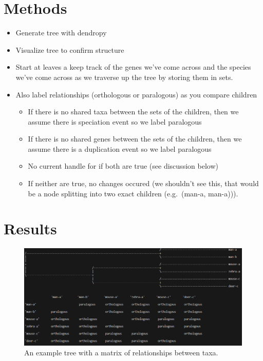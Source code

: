 \documentclass[
  11pt,
  letterpaper,
  oneside]{book}
\providecommand{\tightlist}{%
  \setlength{\itemsep}{0pt}\setlength{\parskip}{0pt}}\usepackage{longtable,booktabs,array}
\begin{document}
\hypertarget{methods}{%
\section{Methods}\label{methods}}

\begin{itemize}
\tightlist
\item
  Generate tree with dendropy
\item
  Visualize tree to confirm structure
\item
  Start at leaves a keep track of the genes we've come across and the
  species we've come across as we traverse up the tree by storing them
  in sets.
\item
  Also label relationships (orthologous or paralogous) as you compare
  children

  \begin{itemize}
  \tightlist
  \item
    If there is no shared taxa between the sets of the children, then we
    assume there is speciation event so we label paralogous
  \item
    If there is no shared genes between the sets of the children, then
    we assume there is a duplication event so we label paralogous
  \item
    No current handle for if both are true (see discussion below)
  \item
    If neither are true, no changes occured (we shouldn't see this, that
    would be a node splitting into two exact children (e.g.~(man-a,
    man-a))).
  \end{itemize}
\end{itemize}

\hypertarget{results}{%
\section{Results}\label{results}}

\begin{figure}

{\centering \includegraphics{./figures/Week1LabelingResult.PNG}

}

\caption{An example tree with a matrix of relationships between taxa.}

\end{figure}
\end{document}
